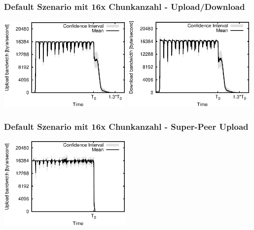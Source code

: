 \begin{frame}
  \frametitle{Default Szenario mit 16x Chunkanzahl - Upload/Download}
  \begin{center}
    \includegraphics[width=0.49\textwidth]{fig/plots/scenario_17_chunk_count_fac_16/plots/GeneratedMeanCurrentUploadBandwidth.csv.eps}
    \includegraphics[width=0.49\textwidth]{fig/plots/scenario_17_chunk_count_fac_16/plots/GeneratedMeanCurrentDownloadBandwidth.csv.eps}
  \end{center}
\end{frame}


\begin{frame}
  \frametitle{Default Szenario mit 16x Chunkanzahl - Super-Peer Upload}
  \begin{center}
    \includegraphics[width=0.49\textwidth]{fig/plots/scenario_17_chunk_count_fac_16/plots/GeneratedMeanCurrentSuperSeederUploadBandwidth.csv.eps}
  \end{center}
\end{frame}

